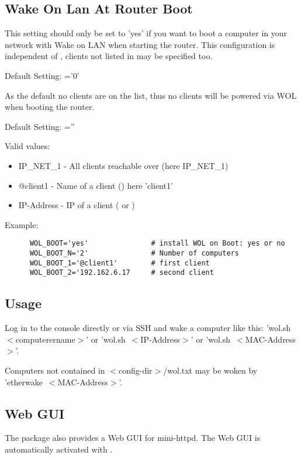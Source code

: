 \subsection{Wake On Lan At Router Boot}
\begin{description}


This setting should only be set to 'yes' if you want to boot a computer in your
network with Wake on LAN when starting the router. This configuration is independent
of , clients not listed in  may be specified too.


	Default Setting:  ='0'

	As the default no clients are on the list, thus no clients will be powered
	via WOL when booting the router.


	Default Setting:  =''

	Valid values:
	\begin{itemize}
		\item IP\_NET\_1	- All clients reachable over  (here IP\_NET\_1)
		\item @client1		- Name of a client () here 'client1'
		\item IP-Address	- IP of a client ( or )
	\end{itemize}

Example:
\begin{example}
\begin{verbatim}
      WOL_BOOT='yes'               # install WOL on Boot: yes or no
      WOL_BOOT_N='2'               # Number of computers
      WOL_BOOT_1='@client1'        # first client
      WOL_BOOT_2='192.162.6.17     # second client
\end{verbatim}
\end{example}

\end{description}

\subsection{Usage}

Log in to the console directly or via SSH and wake a computer like this:
'wol.sh~$<$computerername$>$' or 'wol.sh~$<$IP-Address$>$' or 'wol.sh~$<$MAC-Address$>$'.

Computers not contained in $<$config-dir$>$/wol.txt may be woken by
'etherwake~$<$MAC-Address$>$'.

\subsection {Web GUI}

    The package also provides a Web GUI for mini-httpd.
    The Web GUI is automatically activated with .
